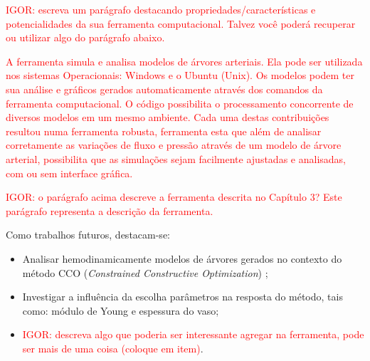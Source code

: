 \documentclass[a4paper,12pt]{monografia}
\theoremstyle{plain}
\theoremstyle{definition}
\theoremstyle{remark}
\begin{document}
\textcolor{red}{IGOR: escreva um parágrafo destacando propriedades/características e potencialidades da sua ferramenta computacional. Talvez você poderá recuperar ou utilizar algo do parágrafo abaixo.}

\textcolor{red}{A ferramenta simula e analisa modelos de árvores arteriais. Ela pode ser utilizada nos sistemas Operacionais: Windows e o Ubuntu (Unix). Os modelos podem ter sua análise e gráficos gerados automaticamente através dos comandos da ferramenta computacional. O código possibilita o processamento concorrente de diversos modelos em um mesmo ambiente. Cada uma destas contribuições resultou numa ferramenta robusta,  ferramenta esta que além de analisar corretamente as variações de fluxo e pressão através de um modelo de árvore arterial, possibilita que as simulações sejam facilmente ajustadas e analisadas, com ou sem interface gráfica.}

\textcolor{red}{IGOR: o parágrafo acima descreve a ferramenta descrita no Capítulo 3? Este parágrafo representa a descrição da ferramenta.}

Como trabalhos futuros, destacam-se:
\begin{itemize}
	\item Analisar hemodinamicamente modelos de árvores gerados no contexto do método CCO (\emph{Constrained Constructive Optimization}) \cite{Karch1999,Queiroz2013,Queiroz2015,Brito2017};
	\item Investigar a influência da escolha parâmetros na resposta do método, tais como: módulo de Young e espessura do vaso;
	\item \textcolor{red} {IGOR: descreva algo que poderia ser interessante agregar na ferramenta, pode ser mais de uma coisa (coloque em item)}.
\end{itemize}






\singlespacing


%
% 

\end{document}
